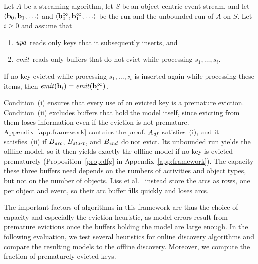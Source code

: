 \begin{proposition}
\label{prop:correctness}
Let $A$ be a streaming algorithm, let $S$ be an object-centric event stream,
and let $\la \mathbf{b}_0, \mathbf{b}_1, \dots \ra$ and
$\la \mathbf{b}_0^\infty, \mathbf{b}_1^\infty, \dots \ra$ be the run and the
unbounded run of $A$ on $S$.
Let $i \ge 0$ and assume that
\begin{enumerate}
  \item[(i)] $\mathit{upd}$ reads only keys that it subsequently inserts, and
  \item[(ii)] $\mathit{emit}$ reads only buffers that do not evict while
        processing $s_1, \dots, s_i$.
\end{enumerate}
If no key evicted while processing $s_1, \dots, s_i$ is inserted again while
processing these items, then
$\mathit{emit}(\mathbf{b}_i) = \mathit{emit}(\mathbf{b}_i^\infty)$.
\end{proposition}

Condition~(i) ensures that every use of an evicted key is a premature
eviction.
Condition~(ii) excludes buffers that hold the model itself, since evicting from
them loses information even if the eviction is not premature.
Appendix~\ref{app:framework} contains the proof.
$A_{\mathit{df}}$ satisfies~(i), and it satisfies~(ii) if $B_{\mathit{arc}}$,
$B_{\mathit{start}}$, and $B_{\mathit{end}}$ do not evict.
Its unbounded run yields the offline model, so it then yields exactly the
offline model if no key is evicted prematurely
(Proposition~\ref{prop:dfg} in Appendix~\ref{app:framework}).
The capacity these three buffers need depends on the numbers of activities and
object types, but not on the number of objects.
Liss et al.~\cite{Liss2025} instead store the arcs as rows, one per object and
event, so their arc buffer fills quickly and loses arcs.

The important factors of algorithms in this framework are thus the choice of
capacity and especially the eviction heuristic, as model errors result from
premature evictions once the buffers holding the model are large enough.
In the following evaluation, we test several heuristics for online discovery
algorithms and compare the resulting models to the offline discovery.
Moreover, we compute the fraction of prematurely evicted keys.
